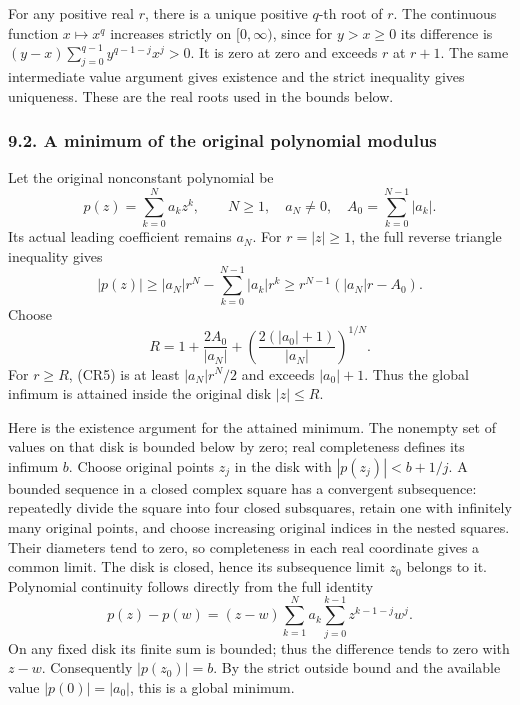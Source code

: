 \documentclass[
  11pt,
]{article}
\begin{document}
For any positive real \(r\), there is a unique positive \(q\)-th root of
\(r\). The continuous function \(x\mapsto x^q\) increases strictly on
\([0,\infty)\), since for \(y>x\geq0\) its difference is
\((y-x)\sum_{j=0}^{q-1}y^{q-1-j}x^j>0\). It is zero at zero and exceeds
\(r\) at \(r+1\). The same intermediate value argument gives existence
and the strict inequality gives uniqueness. These are the real roots
used in the bounds below.

\subsubsection{9.2. A minimum of the original polynomial
modulus}\label{a-minimum-of-the-original-polynomial-modulus}

Let the original nonconstant polynomial be \[
       p(z)=\sum_{k=0}^N a_k z^k,\qquad
              N\geq1,\quad a_N\ne0,\quad
       A_0=\sum_{k=0}^{N-1}|a_k| .                            \tag{CR4}
\] Its actual leading coefficient remains \(a_N\). For \(r=|z|\geq1\),
the full reverse triangle inequality gives \[
 |p(z)|\geq |a_N|r^N-\sum_{k=0}^{N-1}|a_k|r^k
            \geq r^{N-1}(|a_N|r-A_0).                         \tag{CR5}
\] Choose \[
 R=1+\frac{2A_0}{|a_N|}
              +\left(\frac{2(|a_0|+1)}{|a_N|}\right)^{1/N}.
                                                               \tag{CR6}
\] For \(r\geq R\), (CR5) is at least \(|a_N|r^N/2\) and exceeds
\(|a_0|+1\). Thus the global infimum is attained inside the original
disk \(|z|\leq R\).

Here is the existence argument for the attained minimum. The nonempty
set of values on that disk is bounded below by zero; real completeness
defines its infimum \(b\). Choose original points \(z_j\) in the disk
with \(|p(z_j)|<b+1/j\). A bounded sequence in a closed complex square
has a convergent subsequence: repeatedly divide the square into four
closed subsquares, retain one with infinitely many original points, and
choose increasing original indices in the nested squares. Their
diameters tend to zero, so completeness in each real coordinate gives a
common limit. The disk is closed, hence its subsequence limit \(z_0\)
belongs to it. Polynomial continuity follows directly from the full
identity \[
 p(z)-p(w)=(z-w)\sum_{k=1}^N a_k
                    \sum_{j=0}^{k-1}z^{k-1-j}w^j .             \tag{CR7}
\] On any fixed disk its finite sum is bounded; thus the difference
tends to zero with \(z-w\). Consequently \(|p(z_0)|=b\). By the strict
outside bound and the available value \(|p(0)|=|a_0|\), this is a global
minimum.
\end{document}
